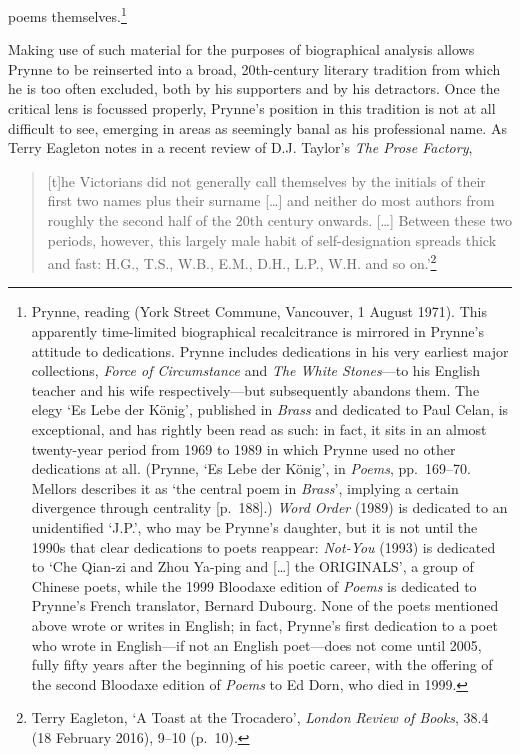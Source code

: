 \documentclass[]{article}
\begin{document}
poems themselves.\footnote{Prynne, reading (York Street Commune,
  Vancouver, 1 August 1971). This apparently time-limited biographical
  recalcitrance is mirrored in Prynne's attitude to dedications. Prynne
  includes dedications in his very earliest major collections,
  \emph{Force of Circumstance} and \emph{The White Stones}---to his
  English teacher and his wife respectively---but subsequently abandons
  them. The elegy `Es Lebe der König', published in \emph{Brass} and
  dedicated to Paul Celan, is exceptional, and has rightly been read as
  such: in fact, it sits in an almost twenty-year period from 1969 to
  1989 in which Prynne used no other dedications at all. (Prynne, `Es
  Lebe der König', in \emph{Poems}, pp.~169--70. Mellors describes it as
  `the central poem in \emph{Brass}', implying a certain divergence
  through centrality {[}p.~188{]}.) \emph{Word Order} (1989) is
  dedicated to an unidentified `J.P.', who may be Prynne's daughter, but
  it is not until the 1990s that clear dedications to poets reappear:
  \emph{Not-You} (1993) is dedicated to `Che Qian-zi and Zhou Ya-ping
  \textbar{} and {[}\ldots{}{]} the ORIGINALS', a group of Chinese
  poets, while the 1999 Bloodaxe edition of \emph{Poems} is dedicated to
  Prynne's French translator, Bernard Dubourg. None of the poets
  mentioned above wrote or writes in English; in fact, Prynne's first
  dedication to a poet who wrote in English---if not an English
  poet---does not come until 2005, fully fifty years after the beginning
  of his poetic career, with the offering of the second Bloodaxe edition
  of \emph{Poems} to Ed Dorn, who died in 1999.}

Making use of such material for the purposes of biographical analysis
allows Prynne to be reinserted into a broad, 20th-century literary
tradition from which he is too often excluded, both by his supporters
and by his detractors. Once the critical lens is focussed properly,
Prynne's position in this tradition is not at all difficult to see,
emerging in areas as seemingly banal as his professional name. As Terry
Eagleton notes in a recent review of D.J. Taylor's \emph{The Prose
Factory},

\begin{quote}
{[}t{]}he Victorians did not generally call themselves by the initials
of their first two names plus their surname {[}\ldots{}{]} and neither
do most authors from roughly the second half of the 20th century
onwards. {[}\ldots{}{]} Between these two periods, however, this largely
male habit of self-designation spreads thick and fast: H.G., T.S., W.B.,
E.M., D.H., L.P., W.H. and so on.'\footnote{Terry Eagleton, `A Toast at
  the Trocadero', \emph{London Review of Books}, 38.4 (18 February
  2016), 9--10 (p.~10).}
\end{quote}
\end{document}

